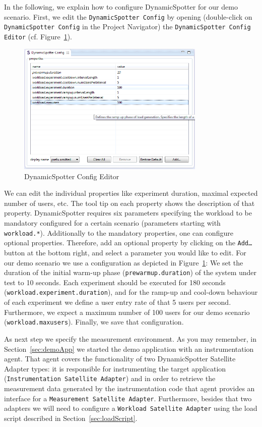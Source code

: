 \documentclass{report}
\newcommand{\DS}{DynamicSpotter }
\begin{document}
In the following, we explain how to configure \DS for our demo scenario. First, we edit the \texttt{\DS Config} by
opening (double-click on \texttt{\DS Config} in the Project Navigator) the \texttt{\DS Config Editor} (cf.
Figure~\ref{fig:confgiEditor}). 
\begin{figure}[h]
\centering
\includegraphics[width=0.8\textwidth]{figures/demo/0005-configEditor.png}
\caption{\DS Config Editor}
\label{fig:confgiEditor}
\end{figure}
We can edit the individual properties like experiment duration, maximal
expected number of users, etc. The tool tip on each property shows the description of that property. 
\DS requires six parameters specifying the workload to be mandatory configured for a certain scenario (parameters
starting with \texttt{workload.*}). Additionally to the mandatory properties, one can configure optional properties. 
Therefore, add an optional property by clicking on the \texttt{Add\ldots} button at the bottom right, and select a
parameter you would like to edit.
For our demo scenario we use a configuration as depicted in Figure~\ref{fig:confgiEditor}: We set the duration of
the initial warm-up phase (\texttt{prewarmup.duration}) of the system under test to 10 seconds. Each experiment should
be executed for 180 seconds (\texttt{workload.experiment.duration}), and for the ramp-up and cool-down behaviour of each
experiment we define a user entry rate of that 5 users per second. Furthermore, we expect a maximum number of 100
users for our demo scenario (\texttt{workload.maxusers}). 
Finally, we save that configuration.

As next step we specify the measurement environment. As you may remember, in Section~\ref{sec:demoApp} we started the
demo application with an instrumentation agent. That agent covers the functionality of two \DS Satellite Adapter types:
it is responsible for instrumenting the target application (\texttt{Instrumentation Satellite Adapter}) and in order to
retrieve the measurement data generated by the instrumentation code that agent provides an interface for a
\texttt{Measurement Satellite Adapter}. Furthermore, besides that two adapters we will need to configure a
\texttt{Workload Satellite Adapter} using the load script described in Section~\ref{sec:loadScript}.
\end{document}
